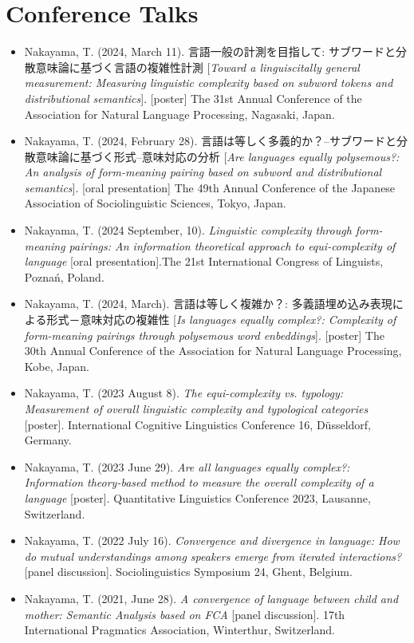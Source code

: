 \documentclass[a4paper,11pt]{article}
\begin{document}
\section*{Conference Talks}
\begin{itemize}[leftmargin=*, itemsep=0em, topsep=0em]
  \item Nakayama, T. (2024, March 11). 言語一般の計測を目指して: サブワードと分散意味論に基づく言語の複雑性計測 [\textit{Toward a linguiscitally general measurement: Measuring linguistic complexity based on subword tokens and distributional semantics}]. [poster] The 31st Annual Conference of the Association for Natural Language Processing, Nagasaki, Japan.
  \item Nakayama, T. (2024, February 28). 言語は等しく多義的か？–サブワードと分散意味論に基づく形式–意味対応の分析 [\textit{Are languages equally polysemous?: An analysis of form-meaning pairing based on subword and distributional semantics}]. [oral presentation] The 49th Annual Conference of the Japanese Association of Sociolinguistic Sciences, Tokyo, Japan.
  \item Nakayama, T. (2024 September, 10). \textit{Linguistic complexity through form-meaning pairings: An information theoretical approach to equi-complexity of language} [oral presentation].The 21st International Congress of Linguists, Poznań, Poland.
  \item Nakayama, T. (2024, March). 言語は等しく複雑か？: 多義語埋め込み表現による形式－意味対応の複雑性 [\textit{Is languages equally complex?: Complexity of form-meaning pairings through polysemous word enbeddings}]. [poster] The 30th Annual Conference of the Association for Natural Language Processing, Kobe, Japan.
  \item Nakayama, T. (2023 August 8). \textit{The equi-complexity vs. typology: Measurement of overall linguistic complexity and typological categories} [poster]. International Cognitive Linguistics Conference 16, Düsseldorf, Germany.
  \item Nakayama, T. (2023 June 29). \textit{Are all languages equally complex?: Information theory-based method to measure the overall complexity of a language} [poster]. Quantitative Linguistics Conference 2023, Lausanne, Switzerland.
  \item Nakayama, T. (2022 July 16). \textit{Convergence and divergence in language: How do mutual understandings among speakers emerge from iterated interactions?} [panel discussion]. Sociolinguistics Symposium 24, Ghent, Belgium.
  \item Nakayama, T. (2021, June 28). \textit{A convergence of language between child and mother: Semantic Analysis based on FCA} [panel discussion]. 17th International Pragmatics Association, Winterthur, Switzerland.
\end{itemize}
\end{document}
